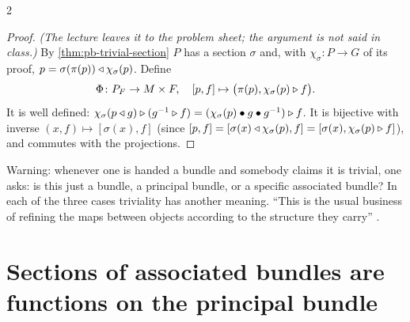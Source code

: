 \begin{paracol}{2}
\begin{proof}
\emph{(The lecture leaves it to the problem sheet; the argument is not said in class.)} By \cref{thm:pb-trivial-section} $P$ has a section $\sigma$ and, with $\chi_\sigma\colon P\to G$ of its proof, $p=\sigma(\pi(p))\mathbin{\triangleleft}\chi_\sigma(p)$. Define
\[
  \Phi\colon P_F\to M\times F,\quad[p,f]\mapsto\bigl(\pi(p),\chi_\sigma(p)\mathbin{\triangleright} f\bigr).
\]
It is well defined: $\chi_\sigma(p\mathbin{\triangleleft} g)\mathbin{\triangleright}(g^{-1}\mathbin{\triangleright} f)=(\chi_\sigma(p)\bullet g\bullet g^{-1})\mathbin{\triangleright} f$. It is bijective with inverse $(x,f)\mapsto[\sigma(x),f]$ (since $[p,f]=[\sigma(x)\mathbin{\triangleleft}\chi_\sigma(p),f]=[\sigma(x),\chi_\sigma(p)\mathbin{\triangleright} f]$), and commutes with the projections. 
\end{proof}
Warning: whenever one is handed a bundle and somebody claims it is trivial, one asks: is this just a bundle, a principal bundle, or a specific associated bundle? In each of the three cases triviality has another meaning. ``This is the usual business of refining the maps between objects according to the structure they carry''  .

\section{Sections of associated bundles are functions on the principal bundle}\label{sec:ab-sections}


\end{paracol}
